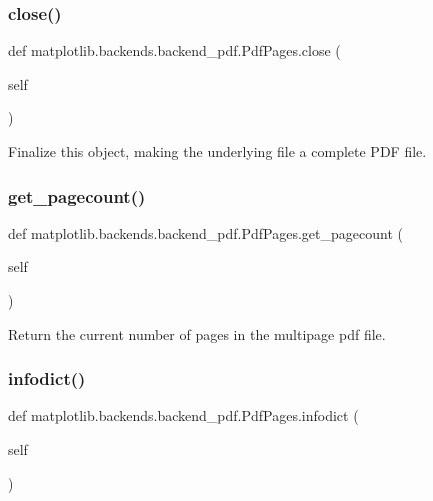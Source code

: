 \subsubsection{\texorpdfstring{close()}{close()}}
{\footnotesize\ttfamily def matplotlib.\+backends.\+backend\+\_\+pdf.\+Pdf\+Pages.\+close (\begin{DoxyParamCaption}\item[{}]{self }\end{DoxyParamCaption})}

\begin{DoxyVerb}Finalize this object, making the underlying file a complete
PDF file.
\end{DoxyVerb}
 \mbox{\label{classmatplotlib_1_1backends_1_1backend__pdf_1_1PdfPages_ad7a8dd73d6362c0c61f4be100cfe6a88}} 
\subsubsection{\texorpdfstring{get\+\_\+pagecount()}{get\_pagecount()}}
{\footnotesize\ttfamily def matplotlib.\+backends.\+backend\+\_\+pdf.\+Pdf\+Pages.\+get\+\_\+pagecount (\begin{DoxyParamCaption}\item[{}]{self }\end{DoxyParamCaption})}

\begin{DoxyVerb}Return the current number of pages in the multipage pdf file.\end{DoxyVerb}
 \mbox{\label{classmatplotlib_1_1backends_1_1backend__pdf_1_1PdfPages_a55064807818dfc2461ad45e78ece4f29}} 
\subsubsection{\texorpdfstring{infodict()}{infodict()}}
{\footnotesize\ttfamily def matplotlib.\+backends.\+backend\+\_\+pdf.\+Pdf\+Pages.\+infodict (\begin{DoxyParamCaption}\item[{}]{self }\end{DoxyParamCaption})}

